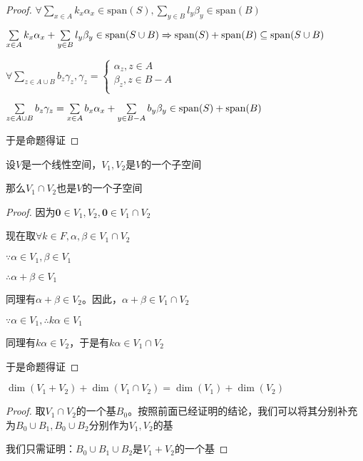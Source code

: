 \documentclass[12pt, a4paper, oneside, UTF8]{ctexbook}
\begin{document}
\begin{para}{0}
\begin{proof}
						$\forall \sum\limits_{x \in A} k_x \alpha_x \in \text{span}(S),\sum\limits_{y \in B} l_y \beta_y \in \text{span}(B)$
					
						$\sum\limits_{x \in A} k_x \alpha_x + \sum\limits_{y \in B} l_y \beta_y \in \operatorname{span}(S\cup B) \Rightarrow \operatorname{span}(S)+\operatorname{span}(B)\subseteq \operatorname{span}(S\cup B)$

						$\forall \sum\limits_{z \in A \cup B} b_z \gamma_z,\gamma_z = \begin{cases}
							\alpha_z , z \in A \\
							\beta_z,z \in B-A \\
						\end{cases}$
						
						$\sum\limits_{z \in A \cup B} b_z \gamma_z= \sum\limits_{x \in A} b_x \alpha_x+\sum\limits_{y \in B-A} b_y \beta_y \in \operatorname{span}(S)+\operatorname{span}(B)$

						于是命题得证
					\end{proof}
				\point{}
					\begin{lemma}{}{}
						设$V$是一个线性空间，$V_1,V_2$是$V$的一个子空间

						那么$V_1 \cap V_2$也是$V$的一个子空间
					\end{lemma}
					\begin{proof}
						因为$\mathbf{0} \in V_1,V_2,\mathbf{0} \in V_1 \cap V_2$

						现在取$\forall k \in F,\alpha ,\beta \in V_1 \cap V_2$

						$\because \alpha \in V_1,\beta \in V_1$

						$\therefore \alpha+\beta \in V_1$

						同理有$\alpha +\beta \in V_2$。因此，$\alpha+\beta \in V_1 \cap V_2$

						$\because \alpha \in V_1,\therefore k \alpha \in V_1$

						同理有$k\alpha \in V_2$，于是有$k \alpha \in V_1 \cap V_2$

						于是命题得证

					\end{proof}
					\begin{proposition}
						$\dim (V_1+V_2)+\dim (V_1 \cap V_2)=\dim(V_1)+\dim(V_2)$
					\end{proposition}
					\begin{proof}
						取$V_1 \cap V_2$的一个基$B_0$。按照前面已经证明的结论，我们可以将其分别补充为$B_0 \cup B_1,B_0 \cup B_2$分别作为$V_1,V_2$的基

						我们只需证明：$B_0 \cup B_1 \cup B_2$是$V_1+V_2$的一个基


\end{proof}
\end{para}
\end{document}
